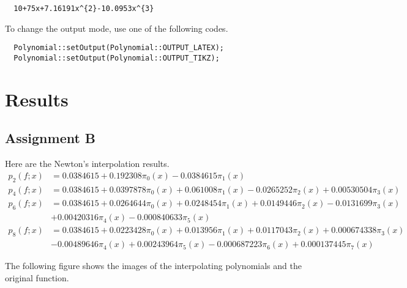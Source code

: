 \documentclass[11pt,en]{elegantpaper}
\begin{document}
\begin{lstlisting}
  10+75x+7.16191x^{2}-10.0953x^{3}
\end{lstlisting}

To change the output mode, use one of the following codes.

\begin{lstlisting}
  Polynomial::setOutput(Polynomial::OUTPUT_LATEX);
  Polynomial::setOutput(Polynomial::OUTPUT_TIKZ);
\end{lstlisting}

\section{Results}

\subsection{Assignment B}

Here are the Newton's interpolation results.
\begin{align*}
  p_2(f;x) &= 0.0384615+0.192308\pi_{0}(x)-0.0384615\pi_{1}(x)\\
  p_4(f;x) &= 0.0384615+0.0397878\pi_{0}(x)+0.061008\pi_{1}(x)-0.0265252\pi_{2}(x)+0.00530504\pi_{3}(x)\\
  p_6(f;x) &= 0.0384615+0.0264644\pi_{0}(x)+0.0248454\pi_{1}(x)+0.0149446\pi_{2}(x)-0.0131699\pi_{3}(x)\\
           &  +0.00420316\pi_{4}(x)-0.000840633\pi_{5}(x)\\
  p_8(f;x) &= 0.0384615+0.0223428\pi_{0}(x)+0.013956\pi_{1}(x)+0.0117043\pi_{2}(x)+0.000674338\pi_{3}(x)\\
           &  -0.00489646\pi_{4}(x)+0.00243964\pi_{5}(x)-0.000687223\pi_{6}(x)+0.000137445\pi_{7}(x)
\end{align*}

The following figure shows the images of the interpolating polynomials and the original function.

\end{document}
